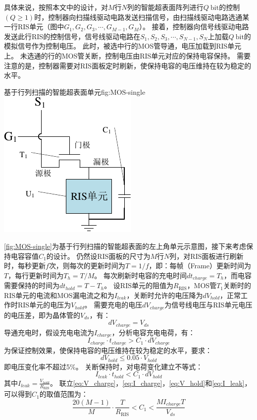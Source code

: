 \documentclass[supercite]{HustGraduPaper}
\begin{document}
具体来说，按照本文中的设计，对$M$行$N$列的智能超表面阵列进行$Q ~ \mathrm{bit}$的控制$(Q \ge 1)$时，控制器向扫描线驱动电路发送扫描信号，由扫描线驱动电路选通某一行RIS单元（图中$G_1,G_2,G_3,\cdots,G_{M-1},G_M$）。
接着，控制器向信号线驱动电路发送此行RIS的控制信号，信号线驱动电路在$S_1,S_2,S_3,\cdots,S_{N-1},S_N$上加载$Q ~ \mathrm{bit}$的模拟信号作为控制电压。
此时，被选中行的MOS管导通，电压加载到RIS单元上。
未选通的行的MOS管关断，控制电压由RIS单元对应的保持电容保持。
需要注意的是，控制器需要对RIS面板定时刷新，使保持电容的电压维持在较为稳定的水平。

\begin{generalfig}[htb]{基于行列扫描的智能超表面单元}{fig:MOS-single}
	\includegraphics[width=0.4\linewidth]{Figures/MOS-single.pdf}
\end{generalfig}

\autoref{fig:MOS-single}为基于行列扫描的智能超表面的左上角单元示意图，接下来考虑保持电容容值$C_1$的设计。
仍然设RIS面板的尺寸为$M$行$N$列，对RIS面板进行刷新时，每秒更新$f$次，则每次的更新时间为$T=1/f$，即：每帧（Frame）更新时间为$T$，每行更新时间为$T_h=T/M$。
每次刷新时电容的充电时间$dt_{charge}=T_h$，而电容需要保持的时间为$dt_{hold}=T-T_h$。
设RIS单元的阻值为$R_\mathrm{RIS}$，MOS管$T_1$关断时的RIS单元的电流和MOS漏电流之和为$I_{leak}$，关断时允许的电压降为$dV_{hold}$，正常工作时RIS单元的电压为$V_{hold}$。
需要充电的电压$dV_{charge}$为信号线电压与RIS单元电压的电压差，即为晶体管的$V_{ds}$，有：
\begin{equation}
	dV_{charge} = V_{ds}
	\label{eq:V_charge}
\end{equation}
导通充电时，假设充电电流为$I_{charge}$，分析电容充电电荷，有：
\begin{equation}
	I_{charge} \cdot t_{charge}>C_1 \cdot dV_{charge}
	\label{eq:I_charge}
\end{equation}
为保证控制效果，使保持电容的电压维持在较为稳定的水平，要求：
\begin{equation}
	dV_{hold} \le 0.05 \cdot V_{hold}
	\label{eq:V_hold}
\end{equation}
即电压变化率不超过5\%。
关断保持时，对电荷变化建立不等式：
\begin{equation}
	I_{leak} \cdot t_{hold} < C_1 \cdot dV_{hold}
	\label{eq:I_leak}
\end{equation}
其中$I_{leak} = \frac{V_{hold}}{R_\mathrm{RIS}}$。
联立\autoref{eq:V_charge}，\autoref{eq:I_charge}，\autoref{eq:V_hold}和\autoref{eq:I_leak}，可以得到$C_1$的取值范围为：
\begin{equation}
	\frac{20(M-1)}{M} \cdot \frac{T}{R_\mathrm{RIS}} < C_1 < \frac{MI_{charge}T}{V_{ds}}
	\label{eq:C1_value}
\end{equation}
\end{document}
